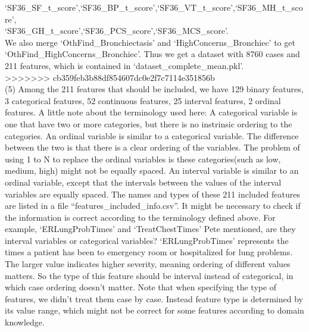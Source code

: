 \documentclass[11pt]{article}
\begin{document}
`SF36\_SF\_t\_score',`SF36\_BP\_t\_score',`SF36\_VT\_t\_score',`SF36\_MH\_t\_score',\\
`SF36\_GH\_t\_score',`SF36\_PCS\_score',`SF36\_MCS\_score'.\\
We also merge `OthFind\_Bronchiectasis' and `HighConcerns\_Bronchiec' to get `OthFind\_HighConcerns\_Bronchiec'. Thus we get a dataset with 8760 cases and 211 features, which is contained in `dataset\_complete\_mean.pkl'. \\
>>>>>>> cb359feb3b88df854607dc0e2f7c7114e351856b
\\
(5) Among the 211 features that should be included, we have 129 binary features, 3 categorical features, 52 continuous features, 25 interval features, 2 ordinal features. A little note about the terminology used here: A categorical variable is one that have two or more categories, but there is no instrinsic ordering to the categories. An ordinal variable is similar to a categorical variable. The difference between the two is that there is a clear ordering of the variables. The problem of using 1 to N to replace the ordinal variables is these categories(such as low, medium, high) might not be equally spaced. An interval variable is similar to an ordinal variable, except that the intervals between the values of the interval variables are equally spaced. The names and types of these 211 included features are listed in a file ``features\_included\_info.csv''. It might be necessary to check if the information is correct according to the terminology defined above. For example, `ERLungProbTimes' and `TreatChestTimes' Pete mentioned, are they interval variables or categorical variables? `ERLungProbTimes' represents the times a patient has been to emergency room or hospitalized for lung problems. The larger value indicates higher severity, meaning ordering of different values matters. So the type of this feature should be interval instead of categorical, in which case ordering doesn't matter. Note that when specifying the type of features, we didn't treat them case by case. Instead feature type is determined by its value range, which might not be correct for some features according to domain knowledge.\\
\\

\end{document}
